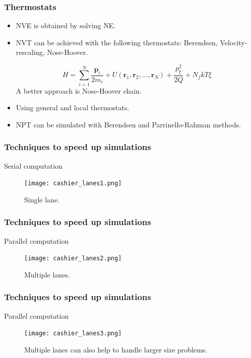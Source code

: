 \documentclass{beamer}
\begin{document}
\begin{frame}\frametitle{Thermostats}

\begin{itemize}
	\item NVE is obtained by solving NE.
	\item NVT can be achieved with the following thermostats: Berendsen, Velocity-rescaling,
		Nose-Hoover.

\begin{equation}
	H= \sum_{i=1}^{N} \frac{\mathbf{p}_i}{2m_i} + U(\mathbf{r}_1,\mathbf{r}_2,\ldots, \mathbf{r}_N) + \frac{p_{\xi}^2}{2Q} 
	+ N_f kT\xi
\end{equation}
 A better approach is Nose-Hoover chain.

	\item  Using general and local thermostats. 

	\item NPT can be simulated with Berendsen and Parrinello-Rahman methods.
\end{itemize}

\end{frame}

\begin{frame}[fragile]\frametitle{Techniques to speed up simulations}

Serial computation

\begin{figure}
\texttt{[image: cashier\_lanes1.png]}
\caption{{\scriptsize  Single lane. }}
\end{figure}

\end{frame}

\begin{frame}[fragile]\frametitle{Techniques to speed up simulations}

Parallel computation

\begin{figure}
\texttt{[image: cashier\_lanes2.png]}
\caption{{\scriptsize  Multiple lanes. }}
\end{figure}

\end{frame}

\begin{frame}[fragile]\frametitle{Techniques to speed up simulations}

Parallel computation

\begin{figure}
\texttt{[image: cashier\_lanes3.png]}
\caption{{\scriptsize  Multiple lanes can also help to handle larger size problems. }}
\end{figure}

\end{frame}
\end{document}
